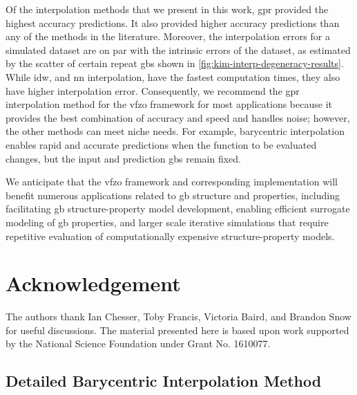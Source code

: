 \documentclass[final,twocolumn,12pt]{elsarticle}
\newcommand{\inpt}{input}
\newcommand{\outpt}{prediction}
\begin{document}
{Of the interpolation methods that we present in this work, \Gls{gpr} provided the highest accuracy predictions. It also provided higher accuracy predictions than any of the methods in the literature. %
Moreover, the interpolation errors for a simulated dataset are on par with the intrinsic errors of the dataset, as estimated by the scatter of certain repeat \glspl{gb} shown in \cref{fig:kim-interp-degeneracy-results}. While \gls{idw}, and \gls{nn} interpolation, have the fastest computation times, they also have higher interpolation error. Consequently, we recommend the \gls{gpr} interpolation method for the \gls{vfzo} framework for most applications because it provides the best combination of accuracy and speed and handles noise; however, the other methods can meet niche needs. For example, barycentric interpolation enables rapid and accurate predictions when the function to be evaluated changes, but the \inpt{} and \outpt{} \glspl{gb} remain fixed. 

We anticipate that the \gls{vfzo} framework and corresponding implementation will benefit numerous applications related to \gls{gb} structure and properties, including facilitating \gls{gb} structure-property model development, enabling efficient surrogate modeling of \gls{gb} properties, and larger scale iterative simulations that require repetitive evaluation of computationally expensive structure-property models.

\section*{Acknowledgement}
\label{sec:acknowledgement}

The authors thank Ian Chesser, Toby Francis, Victoria Baird, and Brandon Snow for useful discussions. The material presented here is based upon work supported by the National Science Foundation under Grant No. 1610077.

% 

\begin{appendices}


\section{Detailed Barycentric Interpolation Method}
\label{sec:app}
\renewcommand\thefigure{\thesection.\arabic{figure}} 
\setcounter{figure}{0}


\end{appendices}}
\end{document}
